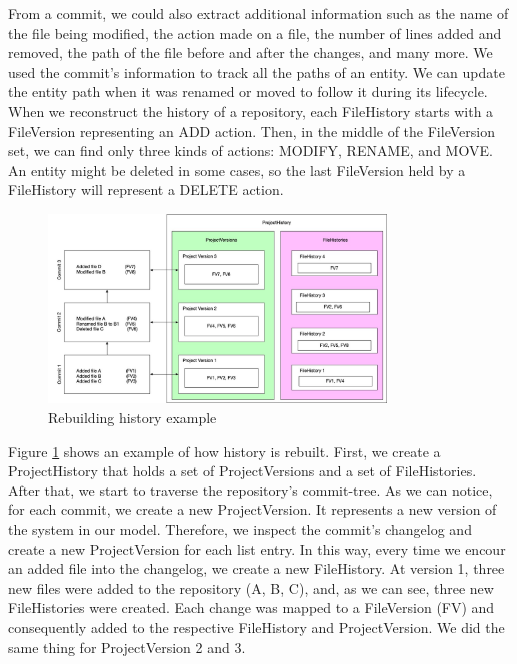 From a commit, we could also extract additional information such as the name of the file being modified, the action made on a file, the number of lines added and removed, the path of the file before and after the changes, and many more.
We used the commit's information to track all the paths of an entity. We can update the entity path when it was renamed or moved to follow it during its lifecycle. \\
\linebreak
When we reconstruct the history of a repository, each FileHistory starts with a FileVersion representing an ADD action. Then, in the middle of the FileVersion set, we can find only three kinds of actions: MODIFY, RENAME, and MOVE. 
An entity might be deleted in some cases, so the last FileVersion held by a FileHistory will represent a DELETE action. 

\begin{figure}
    \begin{center}
        \includegraphics[width=0.8\textwidth]{RebuildingHistory.jpg}
    \end{center}
    \caption{Rebuilding history example}
    \label{fig:RebuildingHistory}
\end{figure}

Figure \ref{fig:RebuildingHistory} shows an example of how history is rebuilt.
First, we create a ProjectHistory that holds a set of ProjectVersions and a set of FileHistories.
After that, we start to traverse the repository's commit-tree.
As we can notice, for each commit, we create a new ProjectVersion. It represents a new version of the system in our model. 
Therefore, we inspect the commit's changelog and create a new ProjectVersion for each list entry.
In this way, every time we encour an added file into the changelog, we create a new FileHistory. 
At version 1, three new files were added to the repository (A, B, C), and, as we can see, three new FileHistories were created.
Each change was mapped to a FileVersion (FV) and consequently added to the respective FileHistory and ProjectVersion. 
We did the same thing for ProjectVersion 2 and 3. 

